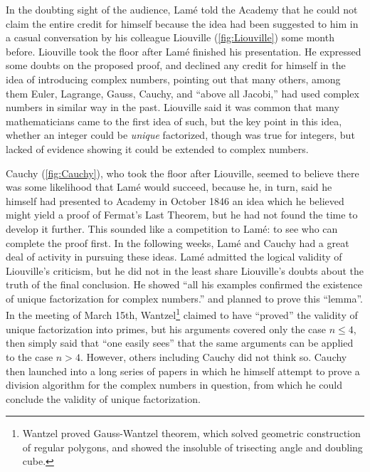 \documentclass[b5paper]{article}
\begin{document}
In the doubting sight of the audience, Lamé told the Academy that he could not claim the entire credit for himself because the idea had been suggested to him in a casual conversation by his colleague Liouville (\cref{fig:Liouville}) some month before. Liouville took the floor after Lamé finished his presentation. He expressed some doubts on the proposed proof, and declined any credit for himself in the idea of introducing complex numbers, pointing out that many others, among them Euler, Lagrange, Gauss, Cauchy, and \enquote{above all Jacobi,} had used complex numbers in similar way in the past. Liouville said it was common that many mathematicians came to the first idea of such, but the key point in this idea, whether an integer could be \emph{unique} factorized, though was true for integers, but lacked of evidence showing it could be extended to complex numbers.

Cauchy (\cref{fig:Cauchy}), who took the floor after Liouville, seemed to believe there was some likelihood that Lamé would succeed, because he, in turn, said he himself had presented to Academy in October 1846 an idea which he believed might yield a proof of Fermat's Last Theorem, but he had not found the time to develop it further. This sounded like a competition to Lamé: to see who can complete the proof first. In the following weeks, Lamé and Cauchy had a great deal of activity in pursuing these ideas. Lamé admitted the logical validity of Liouville's criticism, but he did not in the least share Liouville's doubts about the truth of the final conclusion. He showed \enquote{all his examples confirmed the existence of unique factorization for complex numbers.} and planned to prove this \enquote{lemma}. In the meeting of March 15th, Wantzel\footnote{Wantzel proved Gauss-Wantzel theorem, which solved geometric construction of regular polygons, and showed the insoluble of trisecting angle and doubling cube.} claimed to have \enquote{proved} the validity of unique factorization into primes, but his arguments covered only the case $n \leq 4$, then simply said that \enquote{one easily sees} that the same arguments can be applied to the case $n > 4$. However, others including Cauchy did not think so. Cauchy then launched into a long series of papers in which he himself attempt to prove a division algorithm for the complex numbers in question, from which he could conclude the validity of unique factorization.
\end{document}
